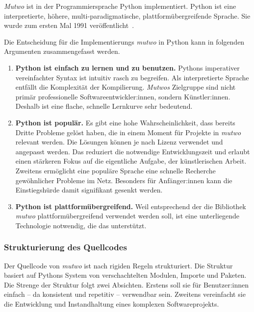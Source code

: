 \documentclass[12pt,a4paper,ngerman]{article}
\begin{document}
\emph{Mutwo} ist in der Programmiersprache Python implementiert.
Python ist eine interpretierte, höhere, multi-paradigmatische, plattformübergreifende Sprache.
Sie wurde zum ersten Mal 1991 veröffentlicht~\parencite{generalPythonFAQ}.

\smallskip

Die Entscheidung für die Implementierungs \emph{mutwo} in Python kann in folgenden Argumenten zusammengefasst werden.


\begin{enumerate}
    \item{
            \textbf{Python ist einfach zu lernen und zu benutzen.}
            Pythons imperativer vereinfachter Syntax ist intuitiv rasch zu begreifen.
            Als interpretierte Sprache entfällt die Komplexität der Kompilierung.
            \emph{Mutwos} Zielgruppe sind nicht primär  professionelle Softwareentwickler:innen, sondern Künstler:innen.
            Deshalb ist eine flache, schnelle Lernkurve sehr bedeutend.
    }
    \item{
            \textbf{Python ist populär.}
            Es gibt eine hohe Wahrscheinlichkeit, dass bereits Dritte Probleme gelöst haben, die in einem Moment für Projekte in \emph{mutwo} relevant werden.
            Die Lösungen können je nach Lizenz verwendet und angepasst werden.
            Das reduziert die notwendige Entwicklungszeit und erlaubt einen stärkeren Fokus auf die eigentliche Aufgabe, der künstlerischen Arbeit.
            Zweitens ermöglicht eine populäre Sprache eine schnelle Recherche gewöhnlicher Probleme im Netz.
            Besonders für Anfänger:innen kann die Einstiegshürde damit signifikant gesenkt werden.
    }
    \item{
            \textbf{Python ist plattformübergreifend.}
            Weil entsprechend der \emph{} die Bibliothek \emph{mutwo} plattformübergreifend verwendet werden soll, ist eine unterliegende Technologie notwendig, die das unterstützt.
    }
\end{enumerate}


\subsubsection{Strukturierung des Quellcodes}
\label{quellcodeStruktur}

Der Quellcode von \emph{mutwo} ist nach rigiden Regeln strukturiert.
Die Struktur basiert auf Pythons System von verschachtelten Modulen, Importe und Paketen.
Die Strenge der Struktur folgt zwei Absichten.
Erstens soll sie für Benutzer:innen einfach -- da konsistent und repetitiv -- verwendbar sein.
Zweitens vereinfacht sie die Entwicklung und Instandhaltung eines komplexen Softwareprojekts.
\end{document}
